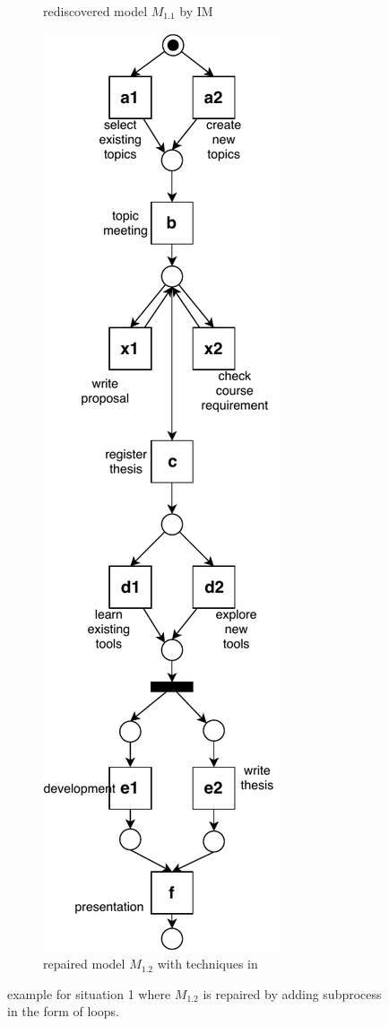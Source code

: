 \begin{figure}[htp]
\begin{subfigure}[b]{0.48\textwidth}
		\caption{rediscovered model $M_{1.1}$ by IM}
		\label{fig:demo_s1_IM}
	\end{subfigure}
	\begin{subfigure}[b]{0.48\textwidth}
		\centering
		\includegraphics[width=0.8\linewidth, height=0.8\textheight]{figures/introduction/thesis-demo-s1-fahland.pdf}
		\caption{repaired model $M_{1.2}$ with techniques in \cite{fahland2015model}}
		\label{fig:demo_s1_fahland}
	\end{subfigure}%
	\caption{example for situation 1 where $M_{1.2}$ is repaired by adding subprocess in the form of loops.}
	\label{fig:demo_s1}
\end{figure}

